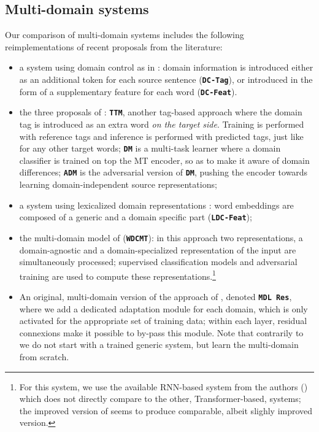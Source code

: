 \documentclass[11pt]{article}
\newcommand{\fyTodo}[1]{\Todo[FY:]{\textcolor{orange}{#1}}}
\newcommand{\fyDone}[1]{\done[FY]\Todo[FY:]{\textcolor{orange}{#1}}}
\newcommand{\system}[1]{\texttt{\textbf{#1}}}
\begin{document}
\subsection{Multi-domain systems \label{ssec:systems}}
\fyDone{Remove Gated residual}
Our comparison of multi-domain systems includes the following reimplementations of recent proposals from the literature:
\begin{itemize}
\item a system using domain control as in \cite{Kobus17domaincontrol}: domain information is introduced either as an additional token for each source sentence (\system{DC-Tag}), or introduced in the form of a supplementary feature for each word (\system{DC-Feat}).
\item the three proposals of \cite{Britz17mixing}: \system{TTM}, another tag-based approach where the domain tag is introduced as an extra word \textsl{on the target side}. Training is performed with reference tags and inference is performed with predicted tags, just like for any other target words; \system{DM} is a multi-task learner where a domain classifier is trained on top the MT encoder, so as to make it aware of domain differences; \system{ADM} is the adversarial version of \system{DM}, pushing the encoder towards learning domain-independent source representations;
\item a system using lexicalized domain representations \cite{Pham19generic}: word embeddings are composed of a generic and a domain specific part (\system{LDC-Feat});
\item the multi-domain model of \cite{Zeng18multidomain} (\system{WDCMT}): in this approach two representations, a domain-agnostic and a domain-specialized representation of the input are simultaneously processed; supervised classification models and adversarial training are used to compute these representations.\footnote{For this system, we use the available RNN-based system from the authors (\fyTodo{URLs}) which does not directly compare to the other, Transformer-based, systems; the improved version of \cite{Su19exploring} seems to produce comparable, albeit slighly improved version.}
\item An original, multi-domain version of the approach of , denoted \system{MDL Res}, where we add a dedicated adaptation module for each domain, which is only activated for the appropriate set of training data; within each layer, residual connexions make it possible to by-pass this module.
Note that contrarily to \cite{Bapna19simple} we do not start with a trained generic system, but learn the multi-domain from scratch. \fyDone{Check this.}
\end{itemize}
\end{document}
